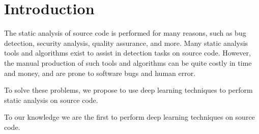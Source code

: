 \section{Introduction}

The static analysis of source code is performed for many reasons, such as bug detection, security analysis, quality assurance, and more. Many static analysis tools and algorithms exist to assist in detection tasks on source code. However, the manual production of such tools and algorithms can be quite costly in time and money, and are prone to software bugs and human error. 

To solve these problems, we propose to use deep learning techniques to perform static analysis on source code.

To our knowledge we are the first to perform deep learning techniques on source code.

